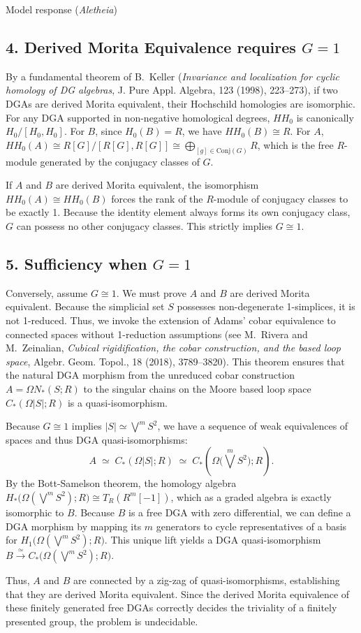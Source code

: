 \documentclass{article}
\theoremstyle{plain}
\theoremstyle{definition}
\begin{document}
\begin{solution}{Model response (\emph{Aletheia})}
\subsection*{4. Derived Morita Equivalence requires $G = 1$}
By a fundamental theorem of B.\ Keller (\textit{Invariance and localization for cyclic homology of DG algebras}, J. Pure Appl. Algebra, 123 (1998), 223--273), if two DGAs are derived Morita equivalent, their Hochschild homologies are isomorphic. For any DGA supported in non-negative homological degrees, $HH_0$ is canonically $H_0 / [H_0, H_0]$.
For $B$, since $H_0(B) = R$, we have $HH_0(B) \cong R$.
For $A$, $HH_0(A) \cong R[G] / [R[G], R[G]] \cong \bigoplus_{[g] \in \text{Conj}(G)} R$, which is the free $R$-module generated by the conjugacy classes of $G$.

If $A$ and $B$ are derived Morita equivalent, the isomorphism $HH_0(A) \cong HH_0(B)$ forces the rank of the $R$-module of conjugacy classes to be exactly 1. Because the identity element always forms its own conjugacy class, $G$ can possess no other conjugacy classes. This strictly implies $G \cong 1$.

\subsection*{5. Sufficiency when $G = 1$}
Conversely, assume $G \cong 1$. We must prove $A$ and $B$ are derived Morita equivalent. Because the simplicial set $S$ possesses non-degenerate 1-simplices, it is not 1-reduced. Thus, we invoke the extension of Adams' cobar equivalence to connected spaces without 1-reduction assumptions (see M.\ Rivera and M.\ Zeinalian, \textit{Cubical rigidification, the cobar construction, and the based loop space}, Algebr. Geom. Topol., 18 (2018), 3789--3820). This theorem ensures that the natural DGA morphism from the unreduced cobar construction $A = \Omega N_*(S; R)$ to the singular chains on the Moore based loop space $C_*(\Omega|S|; R)$ is a quasi-isomorphism.

Because $G \cong 1$ implies $|S| \simeq \bigvee^m S^2$, we have a sequence of weak equivalences of spaces and thus DGA quasi-isomorphisms:
$$ A \;\simeq\; C_*(\Omega|S|; R) \;\simeq\; C_*\left(\Omega \Big(\bigvee^m S^2\Big); R\right). $$
By the Bott-Samelson theorem, the homology algebra $H_*\big(\Omega (\bigvee^m S^2); R\big) \cong T_R(R^m[-1])$, which as a graded algebra is exactly isomorphic to $B$. Because $B$ is a free DGA with zero differential, we can define a DGA morphism by mapping its $m$ generators to cycle representatives of a basis for $H_1\big(\Omega (\bigvee^m S^2); R\big)$. This unique lift yields a DGA quasi-isomorphism $B \xrightarrow{\simeq} C_*\big(\Omega (\bigvee^m S^2); R\big)$.

Thus, $A$ and $B$ are connected by a zig-zag of quasi-isomorphisms, establishing that they are derived Morita equivalent. Since the derived Morita equivalence of these finitely generated free DGAs correctly decides the triviality of a finitely presented group, the problem is undecidable.
\end{solution}
\end{document}
